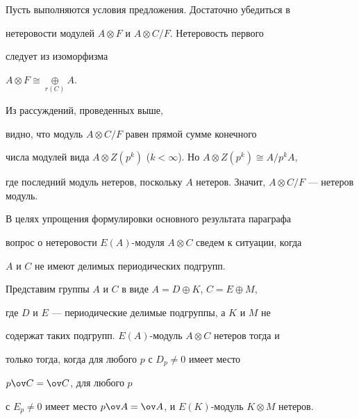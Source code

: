 \begin{pf}
 


Пусть выполняются условия предложения. Достаточно убедиться в 


нетеровости модулей $A\otimes F$ и $A\otimes C/F$. Нетеровость первого 


следует из изоморфизма 


$A\otimes F\cong\mathop{\oplus}\limits_{r(C)}A$. 


Из рассуждений, проведенных выше, 


видно, что модуль $A\otimes C/F$ равен прямой сумме конечного 


числа модулей вида $A\otimes Z(p^k)$ ($k<\infty$). Но $A\otimes 


Z(p^k)\cong A/p^k A$, 


где последний модуль нетеров, поскольку $A$ нетеров. Значит, $A\otimes 


C/F$ --- нетеров модуль. 


\end{pf} 


 


В целях упрощения формулировки основного результата параграфа 


вопрос о нетеровости $E(A)$-модуля $A\otimes C$ сведем к ситуации, когда 


$A$ и $C$ не имеют делимых периодических подгрупп. 


 


\begin{props} 


Представим группы $A$ и $C$ в виде $A=D\oplus K$, $C=E\oplus M$, 


где $D$ и $E$ --- периодические делимые подгруппы, а $K$ и $M$ не 


содержат таких подгрупп.\; $E(A)$-модуль $A\otimes C$ нетеров тогда и 


только тогда, когда для любого $p$ с $D_p\ne0$ имеет место


$p\ov C=\ov C$, для любого $p$ 


с $E_p\ne0$ имеет место $p\ov A=\ov A$, и $E(K)$-модуль $K\otimes M$ нетеров. 


\end{props} 


 


